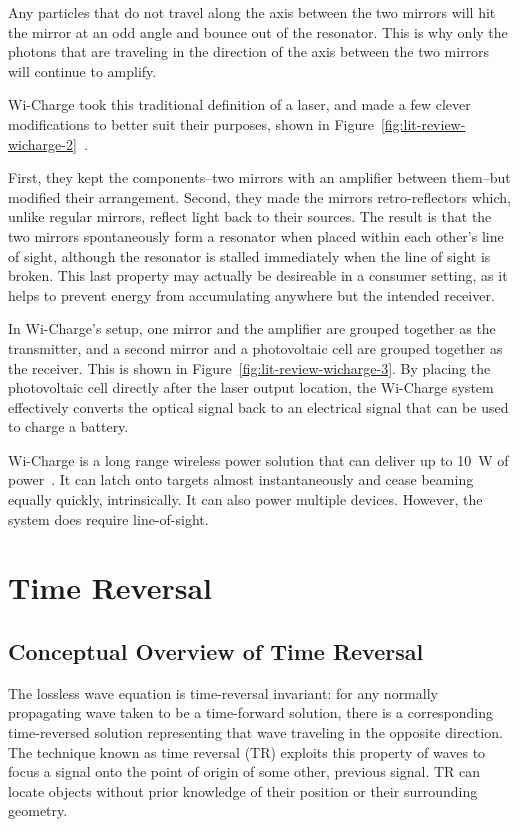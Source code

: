 Any particles that do not travel along the axis between the two mirrors will hit the mirror at an odd angle and bounce out of the resonator. This is why only the photons that are traveling in the direction of the axis between the two mirrors will continue to amplify.

Wi-Charge took this traditional definition of a laser, and made a few clever modifications to better suit their purposes, shown in Figure~\ref{fig:lit-review-wicharge-2}~\cite{wicharge2016}.

First, they kept the components--two mirrors with an amplifier between them--but modified their arrangement. Second, they made the mirrors retro-reflectors which, unlike regular mirrors, reflect light back to their sources. The result is that the two mirrors spontaneously form a resonator when placed within each other's line of sight, although the resonator is stalled immediately when the line of sight is broken. This last property may actually be desireable in a consumer setting, as it helps to prevent energy from accumulating anywhere but the intended receiver.

In Wi-Charge's setup, one mirror and the amplifier are grouped together as the transmitter, and a second mirror and a photovoltaic cell are grouped together as the receiver. This is shown in Figure~\ref{fig:lit-review-wicharge-3}. By placing the photovoltaic cell directly after the laser output location, the Wi-Charge system effectively converts the optical signal back to an electrical signal that can be used to charge a battery.

Wi-Charge is a long range wireless power solution that can deliver up to 10~W of power~\cite{wicharge2016}. It can latch onto targets almost instantaneously and cease beaming equally quickly, intrinsically. It can also power multiple devices. However, the system does require line-of-sight.

\section{Time Reversal}
\label{lit-review-tr}

\subsection{Conceptual Overview of Time Reversal}

The lossless wave equation is time-reversal invariant: for any normally propagating wave taken to be a time-forward solution, there is a corresponding time-reversed solution representing that wave traveling in the opposite direction. The technique known as time reversal (TR) exploits this property of waves to focus a signal onto the point of origin of some other, previous signal. TR can locate objects without prior knowledge of their position or their surrounding geometry.

